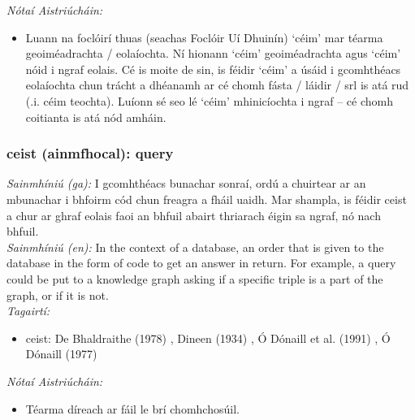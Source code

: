  \noindent \textit{Nótaí Aistriúcháin:}
\begin{itemize}
	\item Luann na foclóirí thuas (seachas Foclóir Uí Dhuinín) `céim' mar téarma geoiméadrachta / eolaíochta. Ní hionann `céim' geoiméadrachta agus `céim' nóid i ngraf eolais. Cé is moite de sin, is féidir `céim' a úsáid i gcomhthéacs eolaíochta chun trácht a dhéanamh ar cé chomh fásta / láidir / srl is atá rud (.i. céim teochta). Luíonn sé seo lé `céim' mhinicíochta i ngraf -- cé chomh coitianta is atá nód amháin.
\end{itemize}


\subsubsection*{ceist (ainmfhocal): query}
 \noindent \textit{Sainmhíniú (ga):} I gcomhthéacs bunachar sonraí, ordú a chuirtear ar an mbunachar i bhfoirm cód chun freagra a fháil uaidh. Mar shampla, is féidir ceist a chur ar ghraf eolais faoi an bhfuil abairt thriarach éigin sa ngraf, nó nach bhfuil.
\\
 \noindent \textit{Sainmhíniú (en):} In the context of a database, an order that is given to the database in the form of code to get an answer in return. For example, a query could be put to a knowledge graph asking if a specific triple is a part of the graph, or if it is not.
\\
 \noindent \textit{Tagairtí:}
\begin{itemize}
	\item ceist: De Bhaldraithe (1978) \cite{de-bhaldraithe}, Dineen (1934) \cite{dineen}, Ó Dónaill et al. (1991) \cite{focloir-beag}, Ó Dónaill (1977) \cite{odonaill}
\end{itemize}

 \noindent \textit{Nótaí Aistriúcháin:}
\begin{itemize}
	\item Téarma díreach ar fáil le brí chomhchosúil.
\end{itemize}


